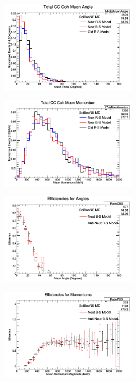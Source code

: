 \documentclass[11pt]{article}
\begin{document}
\begin{figure}[H]
\centering
\includegraphics[width=0.6\textwidth]{NMCombinedPlotsImages/16-NMCombinedPlots.png}
\caption{}
\end{figure}

\begin{figure}[H]
\centering
\includegraphics[width=0.6\textwidth]{NMCombinedPlotsImages/17-NMCombinedPlots.png}
\caption{}
\end{figure}

\begin{figure}[H]
\centering
\includegraphics[width=0.6\textwidth]{NMCombinedPlotsImages/18-NMCombinedPlots.png}
\caption{}
\end{figure}

\begin{figure}[H]
\centering
\includegraphics[width=0.6\textwidth]{NMCombinedPlotsImages/19-NMCombinedPlots.png}
\caption{}
\end{figure}
\end{document}
